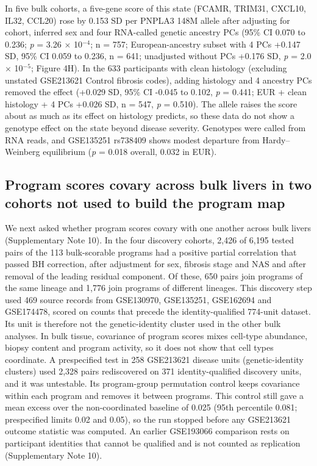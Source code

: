 In five bulk cohorts, a five-gene score of this state (FCAMR, TRIM31, CXCL10, IL32, CCL20) rose by 0.153 SD per PNPLA3 148M allele after adjusting for cohort, inferred sex and four RNA-called genetic ancestry PCs (95\% CI 0.070 to 0.236; \emph{p} = 3.26 $\times$ 10$^{-4}$; n = 757; European-ancestry subset with 4 PCs +0.147 SD, 95\% CI 0.059 to 0.236, n = 641; unadjusted without PCs +0.176 SD, \emph{p} = 2.0 $\times$ 10$^{-5}$; Figure 4H). In the 633 participants with clean histology (excluding unstated GSE213621 Control fibrosis codes), adding histology and 4 ancestry PCs removed the effect (+0.029 SD, 95\% CI -0.045 to 0.102, \emph{p} = 0.441; EUR + clean histology + 4 PCs +0.026 SD, n = 547, \emph{p} = 0.510). The allele raises the score about as much as its effect on histology predicts, so these data do not show a genotype effect on the state beyond disease severity. Genotypes were called from RNA reads, and GSE135251 rs738409 shows modest departure from Hardy--Weinberg equilibrium (\emph{p} = 0.018 overall, 0.032 in EUR).

\subsection{Program scores covary across bulk livers in two cohorts not used to build the program map}\label{program-scores-covary-across-bulk-livers-in-two-cohorts-not-used-to-build-the-program-map}

We next asked whether program scores covary with one another across bulk livers (Supplementary Note 10). In the four discovery cohorts, 2,426 of 6,195 tested pairs of the 113 bulk-scorable programs had a positive partial correlation that passed BH correction, after adjustment for sex, fibrosis stage and NAS and after removal of the leading residual component. Of these, 650 pairs join programs of the same lineage and 1,776 join programs of different lineages. This discovery step used 469 source records from GSE130970, GSE135251, GSE162694 and GSE174478, scored on counts that precede the identity-qualified 774-unit dataset. Its unit is therefore not the genetic-identity cluster used in the other bulk analyses. In bulk tissue, covariance of program scores mixes cell-type abundance, biopsy content and program activity, so it does not show that cell types coordinate. A prespecified test in 258 GSE213621 disease units (genetic-identity clusters) used 2,328 pairs rediscovered on 371 identity-qualified discovery units, and it was untestable. Its program-group permutation control keeps covariance within each program and removes it between programs. This control still gave a mean excess over the non-coordinated baseline of 0.025 (95th percentile 0.081; prespecified limits 0.02 and 0.05), so the run stopped before any GSE213621 outcome statistic was computed. An earlier GSE193066 comparison rests on participant identities that cannot be qualified and is not counted as replication (Supplementary Note 10).

